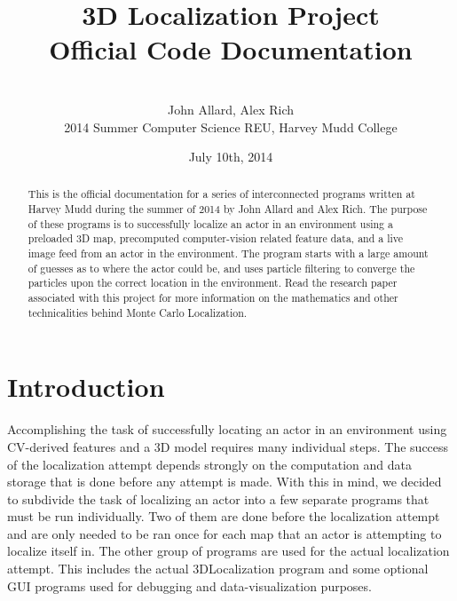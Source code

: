 \documentclass[a4paper,11pt]{article}
\title{3D Localization Project \\ Official Code Documentation}
\author{ \\[6.5in]  John Allard, Alex Rich \\ 2014 Summer Computer Science REU, Harvey Mudd College}
\date{July 10th, 2014}
\begin{document}
  \maketitle
  
  \newpage

    \begin{abstract}
    This is the official documentation for a series of interconnected programs written at Harvey Mudd during the summer of 2014 by John Allard and Alex Rich. The purpose of these programs is to successfully localize an actor in an environment using a preloaded 3D map, precomputed computer-vision related feature data, and a live image feed from an actor in the environment. The program starts with a large amount of guesses as to where the actor could be, and uses particle filtering to converge the particles upon the correct location in the environment. Read the research paper associated with this project for more information on the mathematics and other technicalities behind Monte Carlo Localization.
    \end{abstract}
    
    \tableofcontents
    \newpage

    \section{Introduction}
    Accomplishing the task of successfully locating an actor in an environment using CV-derived features and a 3D model requires many individual steps. The success of the localization attempt depends strongly on the computation and data storage that is done before any attempt is made. With this in mind, we decided to subdivide the task of localizing an actor into a few separate programs that must be run individually. Two of them are done before the localization attempt and are only needed to be ran once for each map that an actor is attempting to localize itself in. The other group of programs are used for the actual localization attempt. This includes the actual 3DLocalization program and some optional GUI programs used for debugging and data-visualization purposes.
    
\end{document}

